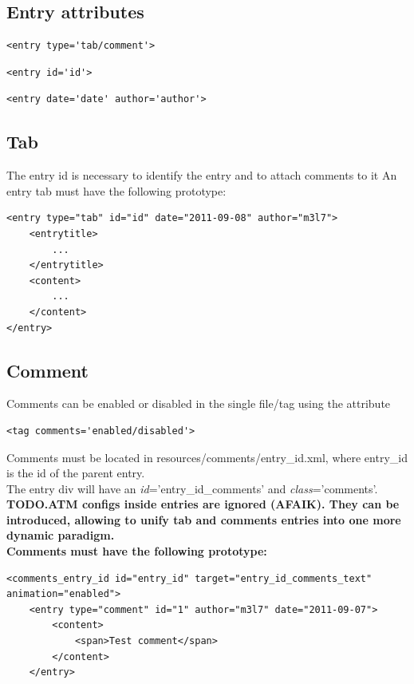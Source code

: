 \documentclass[a4paper,12pt]{article}
\begin{document}
\subsection{Entry attributes}
\begin{list}{-}{}
\item \begin{verbatim}
<entry type='tab/comment'>
      \end{verbatim}
\item \begin{verbatim}
<entry id='id'>
      \end{verbatim}
\item \begin{verbatim}
<entry date='date' author='author'>
      \end{verbatim}

\end{list}
\subsection{Tab}
The entry id is necessary to identify the entry and to attach comments to it
An entry tab must have the following prototype:
\footnotesize
\begin{verbatim}
<entry type="tab" id="id" date="2011-09-08" author="m3l7">
	<entrytitle>
	    ...
	</entrytitle>
	<content> 
	    ...
	</content>
</entry>
\end{verbatim}
\normalsize
\subsection{Comment}
Comments can be enabled or disabled in the single file/tag using the attribute 
\begin{verbatim}
<tag comments='enabled/disabled'>
\end{verbatim}
Comments must be located in resources/comments/entry\_id.xml, where entry\_id is the id of the parent entry.\\
The entry div will have an \emph{id}='entry\_id\_comments' and \emph{class}='comments'.\\[0.2cm]
\bfseries{TODO}.\normalfont ATM configs inside entries are ignored (AFAIK). They can be introduced, allowing to unify tab and comments entries into one more dynamic paradigm.\\
Comments must have the following prototype:
\footnotesize

\begin{verbatim}
<comments_entry_id id="entry_id" target="entry_id_comments_text" animation="enabled">
	<entry type="comment" id="1" author="m3l7" date="2011-09-07">
		<content>
			<span>Test comment</span>
		</content>
	</entry>
\end{verbatim}
\normalsize
\end{document}
